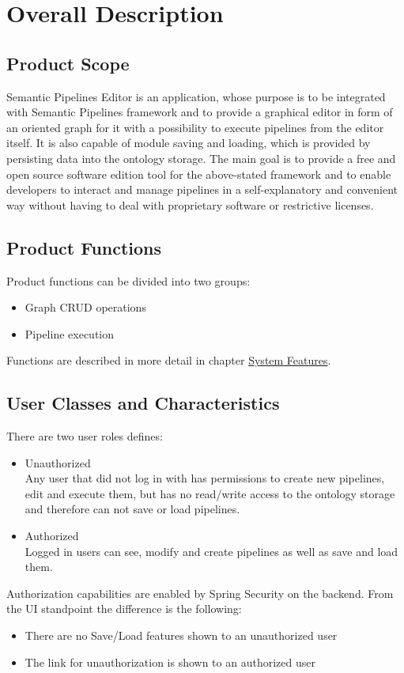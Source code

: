 \documentclass{article}
\begin{document}
\section{Overall Description}
\subsection{Product Scope}
Semantic Pipelines Editor is an application, whose purpose is to be integrated with Semantic Pipelines framework and to provide a graphical editor in form of an oriented graph for it with a possibility to execute pipelines from the editor itself. It is also capable of module saving and loading, which is provided by persisting data into the ontology storage. The main goal is to provide a free and open source software edition tool for the above-stated framework and to enable developers to interact and manage pipelines in a self-explanatory and convenient way without having to deal with proprietary software or restrictive licenses.
\subsection{Product Functions}
Product functions can be divided into two groups:
\begin{itemize}
    \item Graph CRUD operations
    \item Pipeline execution
\end{itemize}
Functions are described in more detail in chapter \hyperref[sec:features]{System Features}.
\subsection{User Classes and Characteristics}
There are two user roles defines:
\begin{itemize}
    \item Unauthorized\\
	Any user that did not log in with has permissions to create new pipelines, edit and execute them, but has no read/write access to the ontology storage and therefore can not save or load pipelines.
    \item Authorized\\
	Logged in users can see, modify and create pipelines as well as save and load them.
\end{itemize}
Authorization capabilities are enabled by Spring Security on the backend. From the UI standpoint the difference is the following:
\begin{itemize}
    \item There are no Save/Load features shown to an unauthorized user
    \item The link for unauthorization is shown to an authorized user
\end{itemize}
\end{document}
